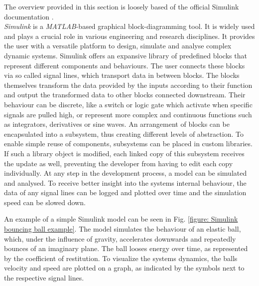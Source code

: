 The overview provided in this section is loosely based of the official Simulink documentation \parencite{matlabSimulinkDocumention}.\\
\textit{Simulink\textsuperscript{\textregistered}} is a \textit{MATLAB\textsuperscript{\textregistered}}-based graphical block-diagramming tool. 
It is widely used and plays a crucial role in various engineering and research disciplines.
It provides the user with a versatile platform to design, simulate and analyse complex dynamic systems.
Simulink offers an expansive library of predefined blocks that represent different components and behaviours.
The user connects these blocks via so called signal lines, which transport data in between blocks.
The blocks themselves transform the data provided by the inputs according to their function and output the transformed data to other blocks connected downstream.
Their behaviour can be discrete, like a switch or logic gate which activate when specific signals are pulled high, or represent more complex and continuous functions such as integrators, derivatives or sine waves.
An arrangement of blocks can be encapsulated into a subsystem, thus creating different levels of abstraction.
To enable simple reuse of components, subsystems can be placed in custom libraries.
If such a library object is modified, each linked copy of this subsystem receives the update as well, preventing the developer from having to edit each copy individually.
At any step in the development process, a model can be simulated and analysed.
To receive better insight into the systems internal behaviour, the data of any signal lines can be logged and plotted over time and the simulation speed can be slowed down.

An example of a simple Simulink model can be seen in Fig. \ref{figure: Simulink bouncing ball example}.
The model simulates the behaviour of an elastic ball, which, under the influence of gravity, accelerates downwards and repeatedly bounces of an imaginary plane.
The ball looses energy over time, as represented by the coefficient of restitution.
To visualize the systems dynamics, the balls velocity and speed are plotted on a graph, as indicated by the symbols next to the respective signal lines.

